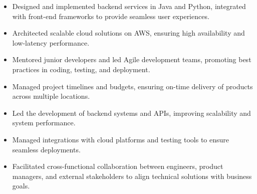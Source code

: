 \par\smallskip
\noindent
\begin{minipage}{20cm}
  \begin{minipage}{9.75cm}
    \begin{itemize}
      \item Designed and implemented backend services in Java and Python, integrated with front-end frameworks to provide seamless user experiences.
      \item Architected scalable cloud solutions on AWS, ensuring high availability and low-latency performance.
    \end{itemize}
  \end{minipage}
  \hfill
  \begin{minipage}{9.75cm}
    \begin{itemize}
      \item Mentored junior developers and led Agile development teams, promoting best practices in coding, testing, and deployment.
      \item Managed project timelines and budgets, ensuring on-time delivery of products across multiple locations.
    \end{itemize}
  \end{minipage}
\end{minipage}
\par\smallskip
\divider

\par\smallskip
\noindent
\begin{minipage}{20cm}
  \begin{minipage}{9.75cm}
    \begin{itemize}
      \item Led the development of backend systems and APIs, improving scalability and system performance.
      \item Managed integrations with cloud platforms and testing tools to ensure seamless deployments.
    \end{itemize}
  \end{minipage}
  \hfill
  \begin{minipage}{9.75cm}
    \begin{itemize}
      \item Facilitated cross-functional collaboration between engineers, product managers, and external stakeholders to align technical solutions with business goals.
    \end{itemize}
  \end{minipage}
\end{minipage}

